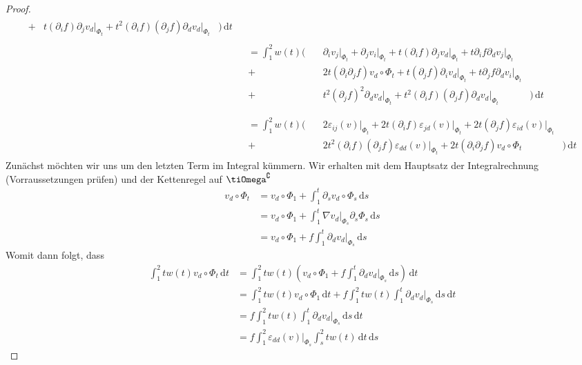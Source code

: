 \documentclass{scrartcl}
\def\e{\varepsilon}
\newcommand{\dif}[1]{\,\mathrm{d} #1}
\begin{document}
\begin{proof}
\begin{align*}
\begin{aligned}
		+&t(\partial_if)\partial_jv_d\big\vert_{\Phi_t}+t^2(\partial_if)(\partial_jf)\partial_dv_d\big\vert_{\Phi_t}&\Big)\dif t
		\end{aligned} \\
		&\begin{aligned}=\int_1^2w(t)\Big(\quad&\partial_iv_j\big\vert_{\Phi_t}+\partial_jv_i\big\vert_{\Phi_t}+t(\partial_if)\partial_jv_d\big\vert_{\Phi_t}+t\partial_if\partial_dv_j\big\vert_{\Phi_t} & \\
		+&2t(\partial_i\partial_jf)v_d\circ\Phi_t+t(\partial_jf)\partial_iv_d\big\vert_{\Phi_t}+t\partial_jf\partial_dv_i\big\vert_{\Phi_t} & \\
		+&t^2(\partial_jf)^2\partial_dv_d\big\vert_{\Phi_t}+t^2(\partial_if)(\partial_jf)\partial_dv_d\big\vert_{\Phi_t}&\Big)\dif t \\
		\end{aligned}\\
		&\begin{aligned}=\int_1^2w(t)\Big(\quad&2\e_{ij}(v)\big\vert_{\Phi_t}+2t(\partial_if)\e_{jd}(v)\big\vert_{\Phi_t}+2t(\partial_jf)\e_{id}(v)\big\vert_{\Phi_t} & \\
		+&2t^2(\partial_if)(\partial_jf)\e_{dd}(v)\big\vert_{\Phi_t}+2t(\partial_{i}\partial_jf)v_d\circ\Phi_t&\Big)\dif t
		\end{aligned}
	\end{align*}
	Zunächst möchten wir uns um den letzten Term im Integral kümmern. Wir erhalten mit dem Hauptsatz der Integralrechnung (Vorraussetzungen prüfen) und der Kettenregel auf $\tiOmega^\complement$
	\begin{align*}
		v_d\circ\Phi_t
		&= v_d\circ\Phi_1+\int_1^t\partial_sv_d\circ\Phi_s\dif s \\
		&= v_d\circ\Phi_1+\int_1^t\nabla v_d\big\vert_{\Phi_s}\partial_s\Phi_s\dif s \\
		&= v_d\circ\Phi_1+f\int_1^t\partial_dv_d\big\vert_{\Phi_s}\dif s
	\end{align*}
	Womit dann folgt, dass
	\begin{align*}
		\int_1^2tw(t)v_d\circ \Phi_t\dif t
		&= \int_1^2tw(t)\left(v_d\circ\Phi_1+f\int_1^t\partial_dv_d\big\vert_{\Phi_s}\dif s\right)\dif t \\
		&= \int_1^2tw(t)v_d\circ\Phi_1\dif t+f\int_1^2tw(t)\int_1^t\partial_dv_d\big\vert_{\Phi_s}\dif s\dif t \\
		&= f\int_1^2tw(t)\int_1^t\partial_dv_d\big\vert_{\Phi_s}\dif s\dif t\\
		&= f\int_1^2\e_{dd}(v)\big\vert_{\Phi_s}\int_s^2tw(t)\dif t\dif s

\end{align*}
\end{proof}
\end{document}
